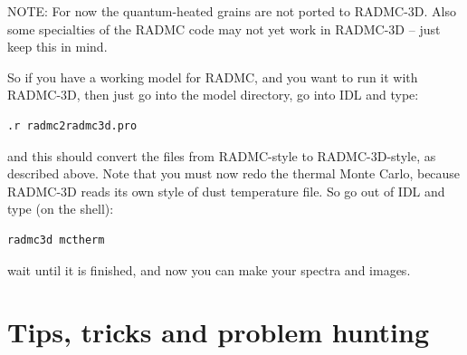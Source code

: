 \documentclass{report}
\begin{document}
NOTE: For now the quantum-heated grains are not ported to RADMC-3D. Also
some specialties of the RADMC code may not yet work in RADMC-3D -- just 
keep this in mind.

So if you have a working model for RADMC, and you want to run it with
RADMC-3D, then just go into the model directory, go into IDL and type:
{\small\begin{verbatim}
.r radmc2radmc3d.pro
\end{verbatim}}
and this should convert the files from RADMC-style to RADMC-3D-style,
as described above. Note that you must now redo the thermal Monte Carlo,
because RADMC-3D reads its own style of dust temperature file. So go
out of IDL and type (on the shell):
{\small\begin{verbatim}
radmc3d mctherm
\end{verbatim}}
wait until it is finished, and now you can make your spectra and images.





\chapter{Tips, tricks and problem hunting}
\label{chap-problem-hunting}
%
\end{document}
